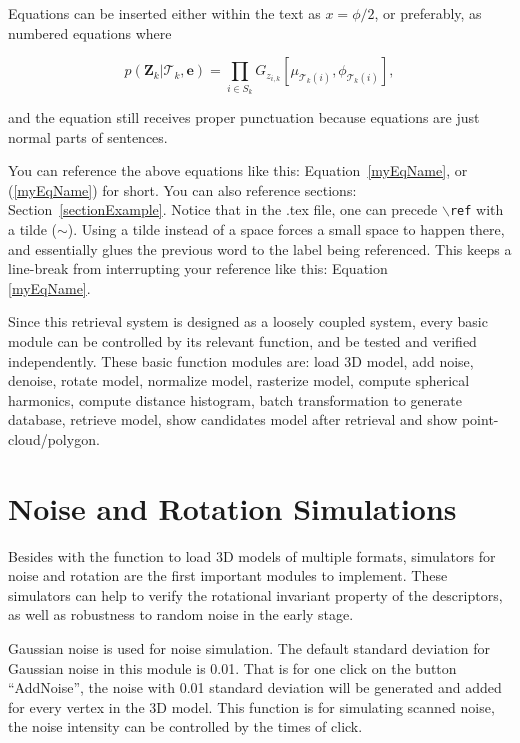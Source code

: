 

Equations can be inserted either within the text as $x=\phi/2$, or preferably, as
numbered equations where

\begin{equation} \label{myEqName}
 p(\mathbf{Z}_{k}|\mathcal{T}_{k},\mathbf{e}) = \prod_{i\in S_{k}}
G_{z_{i,k}}[\mu_{\mathcal{T}_{k}(i)},\phi_{\mathcal{T}_{k}(i)}],
\end{equation}

and the equation still receives proper punctuation because equations are just normal parts of sentences.

You can reference the above equations like this:  Equation~\ref{myEqName}, or (\ref{myEqName}) for short.  You can also reference sections:  Section~\ref{sectionExample}. Notice that in the .tex file, one can precede \texttt{$\backslash$ref} with a tilde ($\sim$). Using a tilde instead of a space forces a small space to happen there, and essentially glues the previous word to the label being referenced. This keeps a line-break from interrupting your reference like this: Equation\\ \ref{myEqName}. 




Since this retrieval system is designed as a loosely coupled system, every basic module can be controlled by its relevant function, and be tested and verified independently. These basic function modules are: load 3D model, add noise, denoise, rotate model, normalize model, rasterize model, compute spherical harmonics, compute distance histogram, batch transformation to generate database, retrieve model, show candidates model after retrieval and show point-cloud/polygon. 

\section{Noise and Rotation Simulations}

Besides with the function to load 3D models of multiple formats, simulators for noise and rotation are the first important modules to implement. These simulators can help to verify the rotational invariant property of the descriptors, as well as robustness to random noise in the early stage.

Gaussian noise is used for noise simulation. The default standard deviation for Gaussian noise in this module is 0.01. That is for one click on the button ``AddNoise'', the noise with 0.01 standard deviation will be generated and added for every vertex in the 3D model. This function is for simulating scanned noise, the noise intensity can be controlled by the times of click. 

